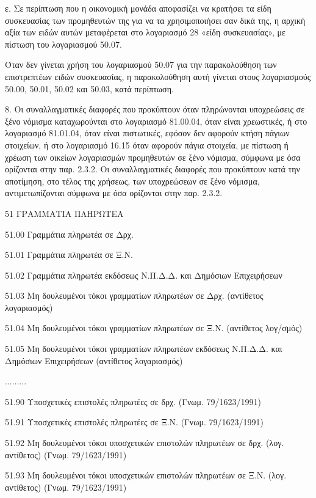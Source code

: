 \documentclass[A4,10pt,greek]{book}
\begin{document}
ε. Σε περίπτωση που η οικονομική μονάδα αποφασίζει να κρατήσει τα είδη συσκευασίας των προμηθευτών της για να τα χρησιμοποιήσει σαν δικά της, η αρχική αξία των ειδών αυτών μεταφέρεται στο λογαριασμό 28 «είδη συσκευασίας», με πίστωση του λογαριασμού 50.07.

Όταν δεν γίνεται χρήση του λογαριασμού 50.07 για την παρακολούθηση των επιστρεπτέων ειδών συσκευασίας, η παρακολούθηση αυτή γίνεται στους λογαριασμούς 50.00, 50.01, 50.02 και 50.03, κατά περίπτωση.

8. Οι συναλλαγματικές διαφορές που προκύπτουν όταν πληρώνονται υποχρεώσεις σε ξένο νόμισμα καταχωρούνται στο λογαριασμό 81.00.04, όταν είναι χρεωστικές, ή στο λογαριασμό 81.01.04, όταν είναι πιστωτικές, εφόσον δεν αφορούν κτήση πάγιων στοιχείων, ή στο λογαριασμό 16.15 όταν αφορούν πάγια στοιχεία, με πίστωση ή χρέωση των οικείων λογαριασμών προμηθευτών σε ξένο νόμισμα, σύμφωνα με όσα ορίζονται στην παρ. 2.3.2. Οι συναλλαγματικές διαφορές που προκύπτουν κατά την αποτίμηση, στο τέλος της χρήσεως, των υποχρεώσεων σε ξένο νόμισμα, αντιμετωπίζονται σύμφωνα με όσα ορίζονται στην παρ. 2.3.2.

 51   ΓΡΑΜΜΑΤΙΑ ΠΛΗΡΩΤΕΑ

        51.00   Γραμμάτια πληρωτέα σε Δρχ.

        51.01   Γραμμάτια πληρωτέα σε Ξ.Ν.

        51.02   Γραμμάτια πληρωτέα εκδόσεως Ν.Π.Δ.Δ. και Δημόσιων
                    Επιχειρήσεων

        51.03   Μη δουλευμένοι τόκοι γραμματίων πληρωτέων σε Δρχ.
                    (αντίθετος λογαριασμός)

        51.04   Μη δουλευμένοι τόκοι γραμματίων πληρωτέων σε Ξ.Ν.
                    (αντίθετος λογ/σμός)

        51.05   Μη δουλευμένοι τόκοι γραμματίων πληρωτέων εκδόσεως Ν.Π.Δ.Δ.
                    και Δημόσιων Επιχειρήσεων (αντίθετος λογαριασμός)

       .........

        51.90   Υποσχετικές επιστολές πληρωτέες σε δρχ. (Γνωμ. 79/1623/1991)

        51.91   Υποσχετικές επιστολές πληρωτέες σε Ξ.Ν. (Γνωμ. 79/1623/1991)

        51.92   Μη δουλευμένοι τόκοι υποσχετικών επιστολών πληρωτέων σε δρχ.
                    (λογ. αντίθετος) (Γνωμ. 79/1623/1991)

        51.93   Μη δουλευμένοι τόκοι υποσχετικών επιστολών πληρωτέων σε Ξ.Ν.
                    (λογ. αντίθετος) (Γνωμ. 79/1623/1991)
\end{document}

